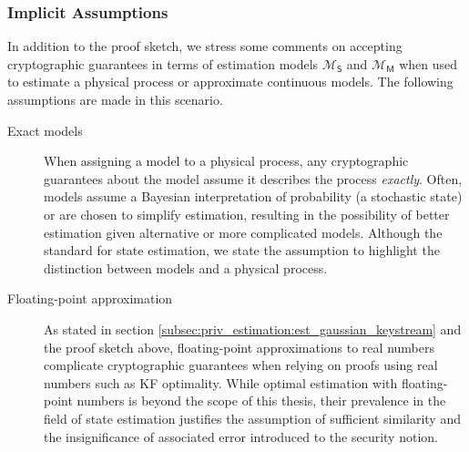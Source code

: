 \subsubsection{Implicit Assumptions}
In addition to the proof sketch, we stress some comments on accepting cryptographic guarantees in terms of estimation models $\mathcal{M}_{\mathsf{S}}$ and $\mathcal{M}_{\mathsf{M}}$ when used to estimate a physical process or approximate continuous models. The following assumptions are made in this scenario.
\begin{description}
    \item[Exact models] When assigning a model to a physical process, any cryptographic guarantees about the model assume it describes the process \textit{exactly}. Often, models assume a Bayesian interpretation of probability (a stochastic state) or are chosen to simplify estimation, resulting in the possibility of better estimation given alternative or more complicated models. Although the standard for state estimation, we state the assumption to highlight the distinction between models and a physical process.
    \item[Floating-point approximation] As stated in section \ref{subsec:priv_estimation:est_gaussian_keystream} and the proof sketch above, floating-point approximations to real numbers complicate cryptographic guarantees when relying on proofs using real numbers such as KF optimality. While optimal estimation with floating-point numbers is beyond the scope of this thesis, their prevalence in the field of state estimation justifies the assumption of sufficient similarity and the insignificance of associated error introduced to the security notion.
\end{description}

% 
% 

